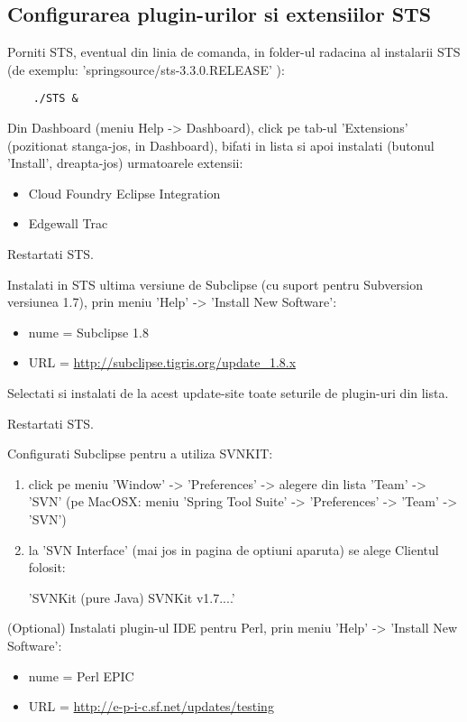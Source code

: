 \subsection{Configurarea plugin-urilor si extensiilor STS}

Porniti STS, eventual din linia de comanda, in folder-ul radacina al instalarii STS
(de exemplu: 'springsource/sts-3.3.0.RELEASE' ):
\begin{lstlisting}	
	./STS &
\end{lstlisting}

Din Dashboard (meniu Help -> Dashboard), click pe tab-ul 'Extensions'
(pozitionat stanga-jos, in Dashboard), bifati in lista si apoi instalati
(butonul 'Install', dreapta-jos) urmatoarele extensii:
\begin{itemize}
\item
Cloud Foundry Eclipse Integration
\item
Edgewall Trac
\end{itemize} 

Restartati STS.

Instalati in STS ultima versiune de Subclipse 
(cu suport pentru Subversion versiunea 1.7),
prin meniu 'Help' -> 'Install New Software':
\begin{itemize}
\item 
nume = Subclipse 1.8
\item
URL = \url{http://subclipse.tigris.org/update_1.8.x}
\end{itemize}

Selectati si instalati de la acest update-site toate seturile de plugin-uri din lista.

Restartati STS.

Configurati Subclipse pentru a utiliza SVNKIT:
\begin{enumerate}
\item 
click pe meniu 'Window' -> 'Preferences' -> alegere din lista 'Team' -> 'SVN'
(pe MacOSX: meniu 'Spring Tool Suite' -> 'Preferences' -> 'Team' -> 'SVN')
\item
la 'SVN Interface' (mai jos in pagina de optiuni aparuta) se alege Clientul
folosit:

'SVNKit (pure Java) SVNKit v1.7....'
\end{enumerate}

(Optional) Instalati plugin-ul IDE pentru Perl, prin meniu 'Help' -> 
'Install New Software':
\begin{itemize}
\item 
nume = Perl EPIC
\item
URL = \url{http://e-p-i-c.sf.net/updates/testing}
\end{itemize}

